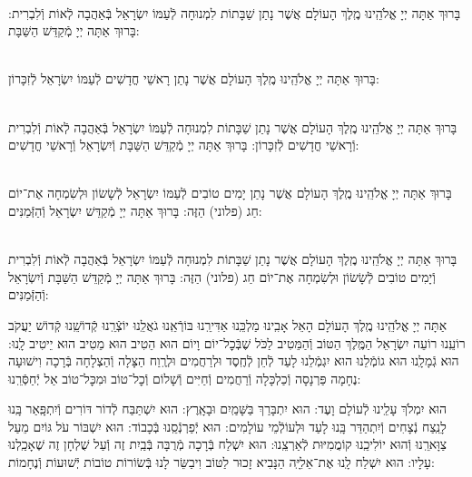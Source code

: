 \documentclass[twoside, openany, parskip=half, 11pt]{book}
\begin{document}
\begin{sometimes}

\\
בָּרוּךְ אַתָּה יְיָ אֱלֹהֵֽינוּ מֶֽלֶךְ הָעוֹלָם אֲשֶׁר נָתַן שַׁבָּתוֹת לִמְנוּחָה לְֿעַמּוֹ יִשְׂרָאֵל בְּֿאַהֲבָה
לְֿאוֹת וְֿלִבְרִית: בָּרוּךְ אַתָּה יְיָ מְֿקַדֵּשׁ הַשַּׁבָּת:


\\
בָּרוּךְ אַתָּה יְיָ אֱלֹהֵֽינוּ מֶֽלֶךְ הָעוֹלָם
אֲשֶׁר נָתַן רָאשֵׁי חֳדָשִׁים לְֿעַמּוֹ יִשְׂרָאֵל לְֿזִכָּרוֹן:


\\
בָּרוּךְ אַתָּה יְיָ אֱלֹהֵֽינוּ מֶֽלֶךְ הָעוֹלָם
אֲשֶׁר נָתַן שַׁבָּתוֹת לִמְנוּחָה לְֿעַמּוֹ יִשְׂרָאֵל בְּֿאַהֲבָה לְֿאוֹת וְֿלִבְרִית וְֿרָאשֵׁי חֳדָשִׁים לְֿזִכָּרוֹן:
בָּרוּךְ אַתָּה יְיָ מְֿקַדֵּשׁ הַשַּׁבָּת וְֿיִשְׂרָאֵל וְֿרָאשֵׁי חֳדָשִׁים:

\\
בָּרוּךְ אַתָּה יְיָ אֱלֹהֵֽינוּ מֶֽלֶךְ הָעוֹלָם
אֲשֶׁר נָתַן יָמִים טוֹבִים לְֿעַמּוֹ יִשְׂרָאֵל
לְֿשָׂשׂוֹן וּלְשִׂמְחָה אֶת־יוֹם חַג (פלוני) הַזֶּה:
בָּרוּךְ אַתָּה יְיָ מְֿקַדֵּשׁ יִשְׂרָאֵל וְֿהַזְּֿמַנִּים:

\\
בָּרוּךְ אַתָּה יְיָ אֱלֹהֵֽינוּ מֶֽלֶךְ הָעוֹלָם אֲשֶׁר נָתַן שַׁבָּתוֹת לִמְנוּחָה לְֿעַמּוֹ יִשְׂרָאֵל בְּֿאַהֲבָה לְֿאוֹת וְֿלִבְרִית
וְֿיָמִים טוֹבִים לְֿשָׂשׂוֹן וּלְשִׂמְחָה אֶת־יוֹם חַג (פלוני) הַזֶּה:
בָּרוּךְ אַתָּה יְיָ מְֿקַדֵּשׁ הַשַּׁבָּת וְֿיִשְׂרָאֵל וְֿהַזְּֿמַנִּים:

\end{sometimes}


אַתָּה יְיָ אֱלֹהֵֽינוּ מֶֽלֶךְ הָעוֹלָם הָאֵל אָבִֽינוּ מַלְכֵּֽנוּ אַדִּירֵֽנוּ בּוֹרְֿאֵֽנוּ גֹאֲלֵֽנוּ יוֹצְֿרֵֽנוּ קְֿדוֹשֵֽׁנוּ קְֿדוֹשׁ יַעֲקֹב רוֹעֵֽנוּ רוֹעֵה יִשְׂרָאֵל הַמֶּֽלֶךְ הַטּוֹב וְֿהַמֵּטִיב לַכֹּל שֶׁבְּֿכׇל־יוֹם וָיוֹם הוּא הֵטִיב הוּא מֵטִיב הוּא יֵיטִיב לָֽנוּ: הוּא גְֿמָלָֽנוּ הוּא גוֹמְֿלֵנוּ הוּא יִגְמְֿלֵנוּ לָעַד לְֿחֵן לְֿחֶֽסֶד וּלְרַחֲמִים וּלְרֶֽוַח הַצָּלָה וְֿהַצְלָחָה בְּֿרָכָה וִישׁוּעָה נֶחָמָה פַּרְנָסָה וְֿכַלְכָּלָה וְֿרַחֲמִים וְֿחַיִּים וְֿשָׁלוֹם וְֿכׇל־טוֹב וּמִכׇּל־טוֹב אַל יְֿחַסְּֿרֵֽנוּ:



הוּא יִמְלֹךְ עָלֵֽינוּ לְֿעוֹלָם וָעֶד:
הוּא יִתְבָּרַךְ בַּשָּׁמַֽיִם וּבָאָֽרֶץ:
הוּא יִשְׁתַּבַּח לְֿדוֹר דּוֹרִים וְֿיִתְפָּֽאַר בָּֽנוּ לָנֵֽצַח נְֿצָחִים
וְֿיִתְהַדַּר בָּֽנוּ לָעַד וּלְעוֹלְֿמֵי עוֹלָמִים:
הוּא יְֿפַרְנְֿסֵֽנוּ בְּֿכָבוֹד:
הוּא יִשְׁבּוֹר עֹל גּוֹיִם מֵעַל צַוָּארֵֽנוּ וְֿהוּא יוֹלִיכֵֽנוּ קוֹמֲמִיּוּת לְֿאַרְצֵֽנוּ:
הוּא יִשְׁלַח בְּֿרָכָה מְֿרֻבָּה בְּֿבַֽיִת זֶה וְֿעַל שֻׁלְחָן זֶה שֶׁאָכַֽלְנוּ עָלָיו:
הוּא יִשְׁלַח לָֽנוּ אֶת־אֵלִיָּֽה הַנָּבִיא זָכוּר לַטּוֹב וִיבַשֵּׂר לָנוּ בְּֿשׂוֹרוֹת טוֹבוֹת יְֿשׁוּעוֹת וְֿנֶחָמוֹת:
\end{document}
